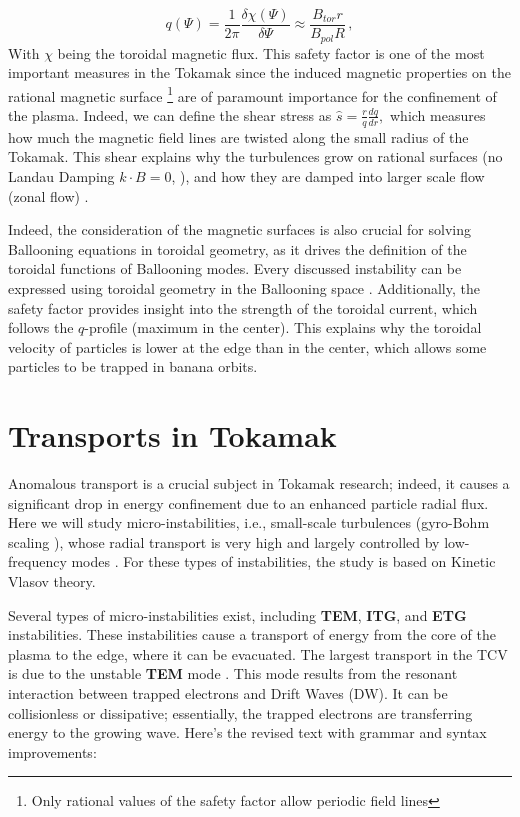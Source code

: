 \documentclass[11pt,a4paper,openany]{report}
\begin{document}
\begin{multicols}{2}
    $$q(\Psi) = \frac{1}{2\pi}\frac{\delta \chi (\Psi)}{\delta \Psi} \approx \frac{B_{tor}r}{B_{pol}R} \, ,$$
    With $\chi$ being the toroidal magnetic flux. This safety factor is one of the most important measures in the Tokamak since the induced magnetic properties on the rational magnetic surface \footnote{Only rational values of the safety factor allow periodic field lines} are of paramount importance for the confinement of the plasma. Indeed, we can define the shear stress as $\hat{s} = \frac{r}{q}\frac{d q}{d r},$ which measures how much the magnetic field lines are twisted along the small radius of the Tokamak. This shear explains why the turbulences grow on rational surfaces (no Landau Damping $k \cdot B = 0$, \cite{TEM_landau_rational}), and how they are damped into larger scale flow (zonal flow) \cite{Scaling_TEM}.

    Indeed, the consideration of the magnetic surfaces is also crucial for solving Ballooning equations in toroidal geometry, as it drives the definition of the toroidal functions of Ballooning modes. Every discussed instability can be expressed using toroidal geometry in the Ballooning space \cite{TEM_ballooning,DW_transport}. Additionally, the safety factor provides insight into the strength of the toroidal current, which follows the $q$-profile (maximum in the center). This explains why the toroidal velocity of particles is lower at the edge than in the center, which allows some particles to be trapped in banana orbits.

    \section{Transports in Tokamak}
    Anomalous transport is a crucial subject in Tokamak research; indeed, it causes a significant drop in energy confinement due to an enhanced particle radial flux. Here we will study micro-instabilities, i.e., small-scale turbulences (gyro-Bohm scaling \cite{Scaling_TEM}), whose radial transport is very high and largely controlled by low-frequency modes \cite{DW_transport}. For these types of instabilities, the study is based on Kinetic Vlasov theory.

    Several types of micro-instabilities exist, including \textbf{TEM}, \textbf{ITG}, and \textbf{ETG} instabilities. These instabilities cause a transport of energy from the core of the plasma to the edge, where it can be evacuated. The largest transport in the TCV is due to the unstable \textbf{TEM} mode \cite{Krutkin_thesis,TEM_slow}. This mode results from the resonant interaction between trapped electrons and Drift Waves (DW). It can be collisionless or dissipative; essentially, the trapped electrons are transferring energy to the growing wave.
    Here’s the revised text with grammar and syntax improvements:


\end{multicols}
\end{document}
